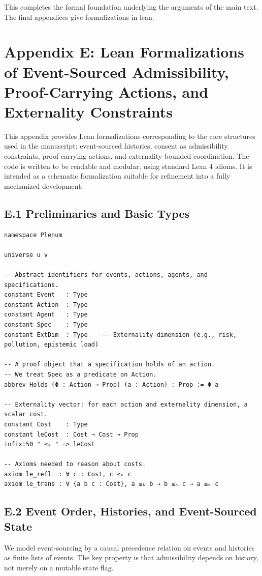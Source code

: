 \documentclass[11pt,oneside]{article}
\begin{document}
This completes the formal foundation underlying the arguments of the main text. The final appendices give formalizations in lean.

\section{Appendix E: Lean Formalizations of Event-Sourced Admissibility, Proof-Carrying Actions, and Externality Constraints}

This appendix provides Lean formalizations corresponding to the core structures used in the manuscript: event-sourced histories, consent as admissibility constraints, proof-carrying actions, and externality-bounded coordination. The code is written to be readable and modular, using standard Lean 4 idioms. It is intended as a schematic formalization suitable for refinement into a fully mechanized development.

\subsection{E.1 Preliminaries and Basic Types}

\begin{verbatim}
namespace Plenum

universe u v

-- Abstract identifiers for events, actions, agents, and specifications.
constant Event   : Type
constant Action  : Type
constant Agent   : Type
constant Spec    : Type
constant ExtDim  : Type    -- Externality dimension (e.g., risk, pollution, epistemic load)

-- A proof object that a specification holds of an action.
-- We treat Spec as a predicate on Action.
abbrev Holds (Φ : Action → Prop) (a : Action) : Prop := Φ a

-- Externality vector: for each action and externality dimension, a scalar cost.
constant Cost    : Type
constant leCost  : Cost → Cost → Prop
infix:50 " ≤ₖ " => leCost

-- Axioms needed to reason about costs.
axiom le_refl  : ∀ c : Cost, c ≤ₖ c
axiom le_trans : ∀ {a b c : Cost}, a ≤ₖ b → b ≤ₖ c → a ≤ₖ c
\end{verbatim}

\subsection{E.2 Event Order, Histories, and Event-Sourced State}

We model event-sourcing by a causal precedence relation on events and histories as finite lists of events. The key property is that admissibility depends on history, not merely on a mutable state flag.
\end{document}
